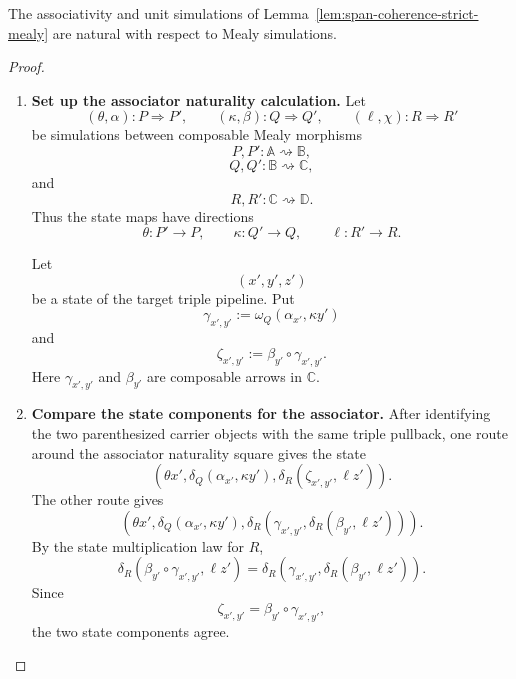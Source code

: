 \begin{lemma}
\label{lem:pipeline-coherence-naturality}
    The associativity and unit simulations of
    Lemma~\ref{lem:span-coherence-strict-mealy} are natural with respect to
    Mealy simulations.
\end{lemma}
\begin{proof}
    \leavevmode
    \begin{enumerate}
        \item \textbf{Set up the associator naturality calculation.}
        Let
        \[
            (\theta,\alpha):P\Rightarrow P',
            \qquad
            (\kappa,\beta):Q\Rightarrow Q',
            \qquad
            (\ell,\chi):R\Rightarrow R'
        \]
        be simulations between composable Mealy morphisms
        \[
            P,P':\mathbb A\rightsquigarrow\mathbb B,
        \]
        \[
            Q,Q':\mathbb B\rightsquigarrow\mathbb C,
        \]
        and
        \[
            R,R':\mathbb C\rightsquigarrow\mathbb D.
        \]
        Thus the state maps have directions
        \[
            \theta:P'\to P,
            \qquad
            \kappa:Q'\to Q,
            \qquad
            \ell:R'\to R.
        \]

        Let
        \[
            (x',y',z')
        \]
        be a state of the target triple pipeline. Put
        \[
            \gamma_{x',y'}
            :=
            \omega_Q(\alpha_{x'},\kappa y')
        \]
        and
        \[
            \zeta_{x',y'}
            :=
            \beta_{y'}\circ\gamma_{x',y'}.
        \]
        Here \(\gamma_{x',y'}\) and \(\beta_{y'}\) are composable arrows in
        \(\mathbb C\).

        \item \textbf{Compare the state components for the associator.}
        After identifying the two parenthesized carrier objects with the same
        triple pullback, one route around the associator naturality square
        gives the state
        \[
            \left(
                \theta x',
                \delta_Q(\alpha_{x'},\kappa y'),
                \delta_R(\zeta_{x',y'},\ell z')
            \right).
        \]
        The other route gives
        \[
            \left(
                \theta x',
                \delta_Q(\alpha_{x'},\kappa y'),
                \delta_R\!\left(
                    \gamma_{x',y'},
                    \delta_R(\beta_{y'},\ell z')
                \right)
            \right).
        \]
        By the state multiplication law for \(R\),
        \[
            \delta_R(
                \beta_{y'}\circ\gamma_{x',y'},
                \ell z'
            )
            =
            \delta_R\!\left(
                \gamma_{x',y'},
                \delta_R(\beta_{y'},\ell z')
            \right).
        \]
        Since
        \[
            \zeta_{x',y'}
            =
            \beta_{y'}\circ\gamma_{x',y'},
        \]
        the two state components agree.


\end{enumerate}
\end{proof}
